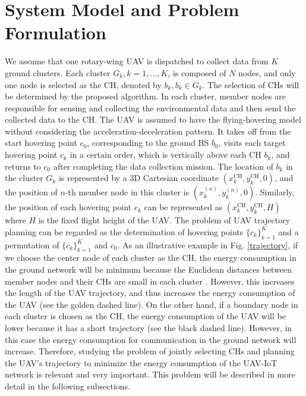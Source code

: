 \documentclass[journal]{IEEEtran}
\begin{document}
	
	
	
	\section{System Model and Problem Formulation}\label{SecIII}
	We assume that one rotary-wing UAV is dispatched to collect data from $K$ ground clusters. Each cluster $G_k, k =1,\dots, K$, is composed of $N$ nodes, and only one node is selected as the CH, denoted by $b_k, b_k \in G_k$. The selection of CHs will be determined by the proposed algorithm. In each cluster, member nodes are responsible for sensing and collecting the environmental data and then send the collected data to the CH. The UAV is assumed to have the flying-hovering model without considering the acceleration-deceleration pattern. It takes off from the start hovering point $c_0$, corresponding to the ground BS $b_0$, visits each target hovering point $c_k$ in a certain order, which is vertically above each CH $b_k$, and returns to $c_0$ after completing the data collection mission. The location of $b_k$ in the cluster $G_k$ is represented by a 3D Cartesian coordinate $(x_k^{\text{CH}}, y_k^{\text{CH}},0)$, and the position of $n$-th member node in this cluster is $(x_k^{(n)}, y_k^{(n)},0)$. Similarly, the position of each hovering point $c_k$ can be represented as $(x_k^{\text{CH}}, y_k^{\text{CH}}, H)$ where $H$ is the fixed flight height of the UAV. The problem of UAV trajectory planning can be regarded as the determination of hovering points $\{c_k\}_{k=1}^K$ and a permutation of $\{c_k\}_{k=1}^K$ and $c_0$. As an illustrative example in Fig. \ref{trajectory}, if we choose the center node of each cluster as the CH, the energy consumption in the ground network will be minimum because the Euclidean distances between member nodes and their CHs are small in each cluster \cite{A. Ray}. However, this increases the length of the UAV trajectory, and thus increases the energy consumption of the UAV (see the golden dashed line). On the other hand, if a boundary node in each cluster is chosen as the CH, the energy consumption of the UAV will be lower because it has a short trajectory (see the black dashed line). However, in this case the energy consumption for communication in the ground network will increase. Therefore, studying the problem of jointly selecting CHs and planning the UAV's trajectory to minimize the energy consumption of the UAV-IoT network is relevant and very important. This problem will be described in more detail in the following subsections.
	
\end{document}
